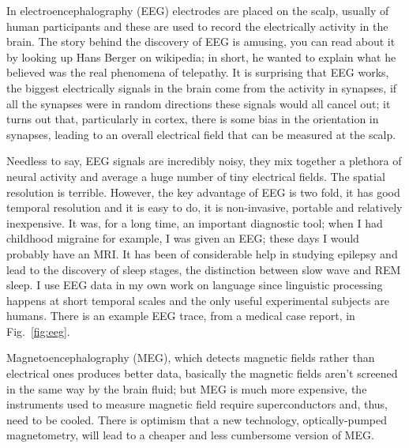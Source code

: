 \documentclass[12pt]{article}
\begin{document}
In electroencephalography (EEG) electrodes are placed on the scalp,
usually of human participants and these are used to record the
electrically activity in the brain. The story behind the discovery of
EEG is amusing, you can read about it by looking up Hans Berger on
wikipedia; in short, he wanted to explain what he believed was the
real phenomena of telepathy. It is surprising that EEG works, the
biggest electrically signals in the brain come from the activity in
synapses, if all the synapses were in random directions these signals
would all cancel out; it turns out that, particularly in cortex, there
is some bias in the orientation in synapses, leading to an overall
electrical field that can be measured at the scalp.

Needless to say, EEG signals are incredibly noisy, they mix together a
plethora of neural activity and average a huge number of tiny
electrical fields. The spatial resolution is terrible. However, the
key advantage of EEG is two fold, it has good temporal resolution and
it is easy to do, it is non-invasive, portable and relatively
inexpensive. It was, for a long time, an important diagnostic tool;
when I had childhood migraine for example, I was given an EEG; these
days I would probably have an MRI. It has been of considerable help in
studying epilepsy and lead to the discovery of sleep stages, the
distinction between slow wave and REM sleep. I use EEG data in my own
work on language since linguistic processing happens at short temporal
scales and the only useful experimental subjects are humans. There is
an example EEG trace, from a medical case report, in
Fig.~\ref{fig:eeg}.

Magnetoencephalography (MEG), which detects magnetic fields rather
than electrical ones produces better data, basically the magnetic
fields aren't screened in the same way by the brain fluid; but MEG is
much more expensive, the instruments used to measure magnetic field
require superconductors and, thus, need to be cooled. There is
optimism that a new technology, optically-pumped magnetometry, will
lead to a cheaper and less cumbersome version of MEG.
\end{document}
